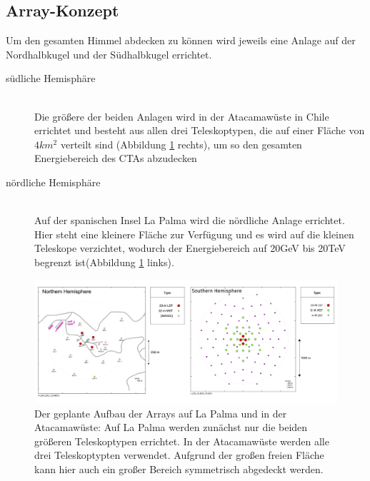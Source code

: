 \subsection{Array-Konzept}
Um den gesamten Himmel abdecken zu können wird jeweils eine Anlage auf der Nordhalbkugel und der Südhalbkugel errichtet.
\begin{description}
\item[südliche Hemisphäre]\hfill \\
Die größere der beiden Anlagen wird in der Atacamawüste in Chile errichtet und besteht aus allen drei Teleskoptypen, die auf einer Fläche von $4\unit{km^2}$ verteilt sind (Abbildung \ref{img:ArrayLayout} rechts), um so den gesamten Energiebereich des CTAs abzudecken
\item[nördliche Hemisphäre]\hfill \\ 
Auf der spanischen Insel La Palma wird die nördliche Anlage errichtet. Hier steht eine kleinere Fläche zur Verfügung und es wird auf die kleinen Teleskope verzichtet, wodurch der Energiebereich auf 20GeV bis 20TeV begrenzt  ist(Abbildung \ref{img:ArrayLayout} links).
\end{description}

\begin{figure}[htbp]
\centering
\includegraphics[width=\textwidth]{Images/ArrayLayout.png}
\caption{Der geplante Aufbau der Arrays auf La Palma und in der Atacamawüste: Auf La Palma werden zunächst nur die beiden größeren Teleskoptypen errichtet. In der Atacamawüste werden alle drei Teleskoptypten verwendet. Aufgrund der großen freien Fläche kann hier auch ein großer Bereich symmetrisch abgedeckt werden.\cite{Flickr}}
\label{img:ArrayLayout}
\end{figure}

